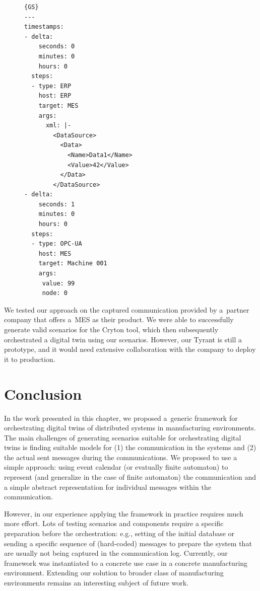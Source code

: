 {\begin{figure}
\begin{lstlisting}[caption=Generated scenario,frame=tlrb,label={list:GS}]{GS}
---
timestamps:
- delta:
    seconds: 0
    minutes: 0
    hours: 0
  steps:
  - type: ERP
    host: ERP
    target: MES
    args:
      xml: |-
        <DataSource>
          <Data>
            <Name>Data1</Name>
            <Value>42</Value>
          </Data>
        </DataSource>
- delta:
    seconds: 1
    minutes: 0 
    hours: 0
  steps:
  - type: OPC-UA
    host: MES
    target: Machine 001
    args:
     value: 99
     node: 0
\end{lstlisting}
\captionsetup{labelformat=empty}
\caption{}
\end{figure}

%
We tested our approach on the captured communication provided by a~partner
company that offers a~MES as their product. We were able to successfully
generate valid scenarios for the Cryton tool, which then subsequently
orchestrated a digital twin using our scenarios.
However, our Tyrant is still a prototype, and it would need extensive collaboration
with the company to deploy it to production.
%

\section{Conclusion}

In the work presented in this chapter, we proposed a~generic framework for orchestrating digital
twins of distributed systems in manufacturing environments. 
%
The main challenges of generating scenarios suitable for orchestrating digital
twins is finding suitable models for (1) the communication in the systems and
(2) the actual sent messages during the communications.
%
We proposed to use a simple approach: using event calendar (or evatually finite automaton)
to represent (and generalize in the case of finite automaton) the communication and
a simple abstract representation for individual messages within the communication.

However, in our experience applying the framework in practice requires much
more effort. 
%
Lots of testing scenarios and components require a specific preparation before
the orchestration: e.g., setting of the initial database or sending a specific
sequence of (hard-coded) messages to prepare the system that are usually not
being captured in the communication log.
%
Currently, our framework was instantiated to a concrete use case in a concrete manufacturing
environment.
%
Extending our solution to broader class of manufacturing
environments remains an interesting subject of future work.

}

